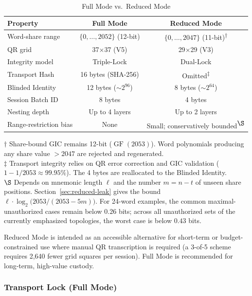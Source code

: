 \documentclass[11pt]{article}
\newcommand{\GF}{\operatorname{GF}}
\begin{document}
\begin{table}[ht!]
\centering
\caption{Full Mode vs.\ Reduced Mode}
\label{tab:modes}
\small
\begin{tabular}{@{}lcc@{}}
\toprule
\textbf{Property} & \textbf{Full Mode} & \textbf{Reduced Mode} \\ \midrule
Word-share range & $\{0, \ldots, 2052\}$ (12-bit) & $\{0, \ldots, 2047\}$ (11-bit)\textsuperscript{$\dagger$} \\
QR grid & 37$\times$37 (V5) & 29$\times$29 (V3) \\
Integrity model & Triple-Lock & Dual-Lock \\
Transport Hash & 16 bytes (SHA-256) & Omitted\textsuperscript{$\ddagger$} \\
Blinded Identity & 12 bytes (${\sim}2^{96}$) & 8 bytes (${\sim}2^{64}$) \\
Session Batch ID & 8 bytes & 4 bytes \\
Nesting depth & Up to 4 layers & Up to 2 layers \\
Range-restriction bias & None & Small; conservatively bounded\textsuperscript{$\S$} \\
\bottomrule
\end{tabular}

\medskip
\footnotesize
$\dagger$ Share-bound GIC remains 12-bit ($\GF(2053)$). Word polynomials producing any share value $> 2047$ are rejected and regenerated.\\
$\ddagger$ Transport integrity relies on QR error correction and GIC validation ($1 - 1/2053 \approx 99.95\%$). The 4 bytes are reallocated to the Blinded Identity.\\
$\S$ Depends on mnemonic length $\ell$ and the number $m = n - t$ of unseen share positions. Section~\ref{sec:reduced-leak} gives the bound $\ell \cdot \log_2\!\bigl(2053/(2053 - 5m)\bigr)$. For 24-word examples, the common maximal-unauthorized cases remain below $0.26$ bits; across all unauthorized sets of the currently emphasized topologies, the worst case is below $0.43$ bits.
\end{table}

Reduced Mode is intended as an accessible alternative for short-term or budget-constrained use where manual QR transcription is required (a 3-of-5 scheme requires 2{,}640 fewer grid squares per session). Full Mode is recommended for long-term, high-value custody.

\subsubsection{Transport Lock (Full Mode)}
\label{sec:transport-lock}
\end{document}
